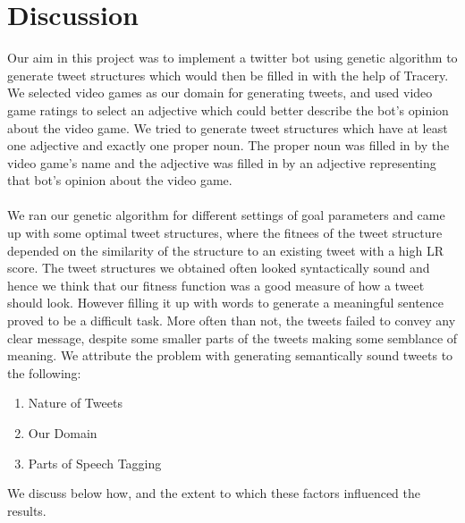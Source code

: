 \section{Discussion}
Our aim in this project was to implement a twitter bot using genetic algorithm to generate tweet structures which would then be filled in with the help of Tracery. We selected video games as our domain for generating tweets, and used video game ratings to select an adjective which could better describe the bot's opinion about the video game. We tried to generate tweet structures which have at least one adjective and exactly one proper noun. The proper noun was filled in by the video game's name and the adjective was filled in by an adjective representing that bot's opinion about the video game.
\paragraph{}
We ran our genetic algorithm for different settings of goal parameters and came up with some optimal tweet structures, where the fitnees of the tweet structure depended on the similarity of the structure to an existing tweet with a high LR score. The tweet structures we obtained often looked syntactically sound and hence we think that our fitness function was a good measure of how a tweet should look. However filling it up with words to generate a meaningful sentence proved to be a difficult task. More often than not, the tweets failed to convey any clear message, despite some smaller parts of the tweets making some semblance of meaning. We attribute the problem with generating semantically sound tweets to the following:
\begin{enumerate}
    \item Nature of Tweets
    \item Our Domain
    \item Parts of Speech Tagging
\end{enumerate}
We discuss below how, and the extent to which these factors influenced the results.

